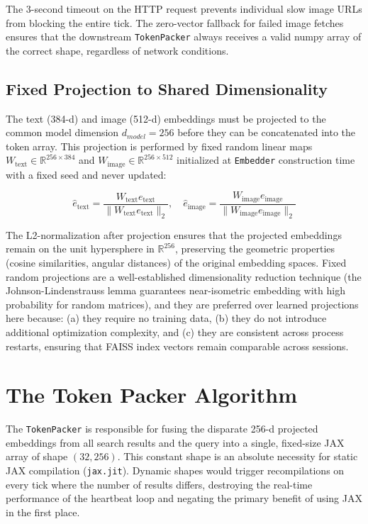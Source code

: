 The 3-second timeout on the HTTP request prevents individual slow image URLs from blocking the entire tick. The zero-vector fallback for failed image fetches ensures that the downstream \texttt{TokenPacker} always receives a valid numpy array of the correct shape, regardless of network conditions.

\subsection{Fixed Projection to Shared Dimensionality}

The text (384-d) and image (512-d) embeddings must be projected to the common model dimension $d_{model} = 256$ before they can be concatenated into the token array. This projection is performed by fixed random linear maps $W_{\text{text}} \in \mathbb{R}^{256 \times 384}$ and $W_{\text{image}} \in \mathbb{R}^{256 \times 512}$ initialized at \texttt{Embedder} construction time with a fixed seed and never updated:

\begin{equation}
\hat{e}_{\text{text}} = \frac{W_{\text{text}} e_{\text{text}}}{\|W_{\text{text}} e_{\text{text}}\|_2}, \quad
\hat{e}_{\text{image}} = \frac{W_{\text{image}} e_{\text{image}}}{\|W_{\text{image}} e_{\text{image}}\|_2}
\end{equation}

The L2-normalization after projection ensures that the projected embeddings remain on the unit hypersphere in $\mathbb{R}^{256}$, preserving the geometric properties (cosine similarities, angular distances) of the original embedding spaces. Fixed random projections are a well-established dimensionality reduction technique (the Johnson-Lindenstrauss lemma guarantees near-isometric embedding with high probability for random matrices), and they are preferred over learned projections here because: (a) they require no training data, (b) they do not introduce additional optimization complexity, and (c) they are consistent across process restarts, ensuring that FAISS index vectors remain comparable across sessions.

\section{The Token Packer Algorithm}

The \texttt{TokenPacker} is responsible for fusing the disparate 256-d projected embeddings from all search results and the query into a single, fixed-size JAX array of shape $(32, 256)$. This constant shape is an absolute necessity for static JAX compilation (\texttt{jax.jit}). Dynamic shapes would trigger recompilations on every tick where the number of results differs, destroying the real-time performance of the heartbeat loop and negating the primary benefit of using JAX in the first place.

